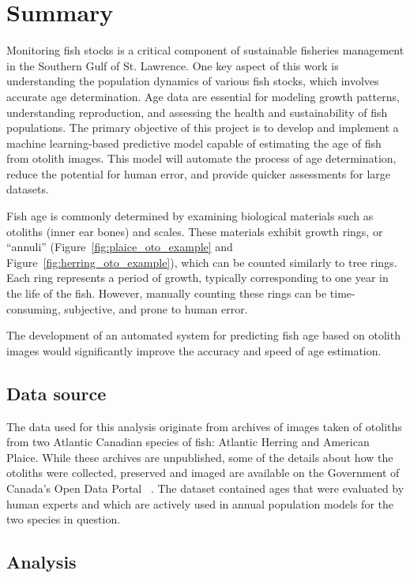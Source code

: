 \section{Summary}


Monitoring fish stocks is a critical component of sustainable fisheries management in the Southern Gulf of St. Lawrence.
One key aspect of this work is understanding the population dynamics of various fish stocks, which involves accurate age determination.
Age data are essential for modeling growth patterns, understanding reproduction, and assessing the health and sustainability of fish populations.
The primary objective of this project is to develop and implement a machine learning-based predictive model capable of estimating the age of fish from otolith images.
This model will automate the process of age determination, reduce the potential for human error, and provide quicker assessments for large datasets.

Fish age is commonly determined by examining biological materials such as otoliths (inner ear bones) and scales.
These materials exhibit growth rings, or \enquote{annuli} (Figure~\ref{fig:plaice_oto_example} and Figure~\ref{fig:herring_oto_example}), which can be counted similarly to tree rings.
Each ring represents a period of growth, typically corresponding to one year in the life of the fish.
However, manually counting these rings can be time-consuming, subjective, and prone to human error.

The development of an automated system for predicting fish age based on otolith images would significantly improve the accuracy and speed of age estimation.

\subsection{Data source}

The data used for this analysis originate from archives of images taken of otoliths from two Atlantic Canadian species of fish: Atlantic Herring and American Plaice.
While these archives are unpublished, some of the details about how the otoliths were collected, preserved and imaged are available on the Government of Canada's Open Data Portal ~\cite{ogp_plaice}.
The dataset contained ages that were evaluated by human experts and which are actively used in annual population models for the two species in question.

\subsection{Analysis}

